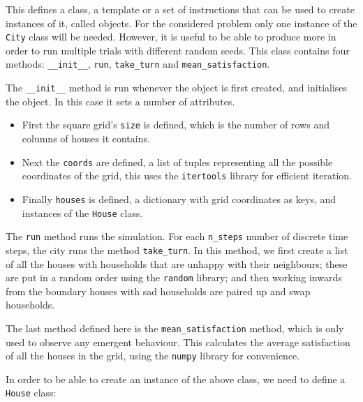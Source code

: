 This defines a class, a template or a set of instructions that can be used to
create instances of it, called objects.
For the considered problem only one instance of the \texttt{City}
class will be needed.
However, it is useful to be able to produce more in order to run multiple trials
with different random seeds.
This class contains four methods: \texttt{__init__},
\texttt{run}, \texttt{take_turn} and
\texttt{mean_satisfaction}.

The \texttt{__init__} method is run whenever the object is first
created, and initialises the object.
In this case it sets a number of attributes.

\begin{itemize}
     \item First the square grid's \texttt{size} is defined, which
           is the number of rows and columns of houses it contains.
     \item Next the \texttt{coords} are defined, a list of tuples
           representing all the possible coordinates of the grid, this uses the
           \texttt{itertools} library for efficient iteration.
     \item Finally \texttt{houses} is defined, a dictionary with
           grid coordinates as keys, and instances of the
           \texttt{House} class.
\end{itemize}


The \texttt{run} method runs the simulation. For each
\texttt{n_steps} number of discrete time steps, the city runs the
method \texttt{take_turn}.
In this method, we first create a list of all the houses with households that
are unhappy with their neighbours; these are put in a random order using the
\texttt{random} library; and then working inwards from the boundary
houses with sad households are paired up and swap households.

The last method defined here is the \texttt{mean_satisfaction}
method, which is only used to observe any emergent behaviour.
This calculates the average satisfaction of all the houses in the grid, using
the \texttt{numpy} library for convenience.

In order to be able to create an instance of the above class, we need to define
a \texttt{House} class:

